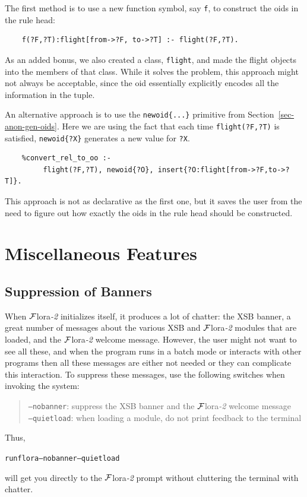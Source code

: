 \documentclass[11pt]{article}
\newcommand{\FLSYSTEM}{{\mbox{\sc ${\cal F}${lora}\rm\emph{-2}}}\xspace}
\newcommand{\ENGINERUN}{runflora}
\begin{document}
The first method is to use a new function symbol, say {\tt f}, to construct
the oids in the rule head:
\begin{verbatim}
    f(?F,?T):flight[from->?F, to->?T] :- flight(?F,?T).  
\end{verbatim}
As an added bonus, we also created a class, {\tt flight}, and made the
flight objects into the members of that class. 
While it solves the problem, this approach might not always be acceptable,
since the oid essentially explicitly encodes all the information in the tuple.

An alternative approach is to use the {\tt newoid\{...\}} primitive from
Section~\ref{sec-anon-gen-oids}. Here we are using the fact that each time
{\tt flight(?F,?T)} is satisfied, {\tt newoid\{?X\}} generates a new value for
{\tt ?X}.    
\begin{verbatim}
    %convert_rel_to_oo :-
         flight(?F,?T), newoid{?O}, insert{?O:flight[from->?F,to->?T]}.
\end{verbatim}
This approach is not as declarative as the first one, but it saves the user
from the need to figure out how exactly the oids in the rule head should be
constructed.


\section{Miscellaneous Features}

\subsection{Suppression of Banners}
When \FLSYSTEM initializes itself, it produces a lot of chatter: the XSB
banner, a great number of messages about the various XSB and \FLSYSTEM modules
that are loaded, and the \FLSYSTEM welcome message. However, the user might
not want to see all these, and when the program runs in a batch mode
or interacts with other programs then all these messages are either not
needed or they can complicate this interaction. To suppress these messages,
use the following switches when invoking the system:
\begin{quote}
{\tt --nobanner}: suppress the XSB banner and the \FLSYSTEM welcome message\\
{\tt --quietload}: when loading a module, do not print feedback to the terminal
\end{quote}
Thus,
\begin{alltt}
 \ENGINERUN --nobanner --quietload  
\end{alltt}
will get you directly to the \FLSYSTEM prompt without cluttering the terminal
with chatter.
\end{document}
